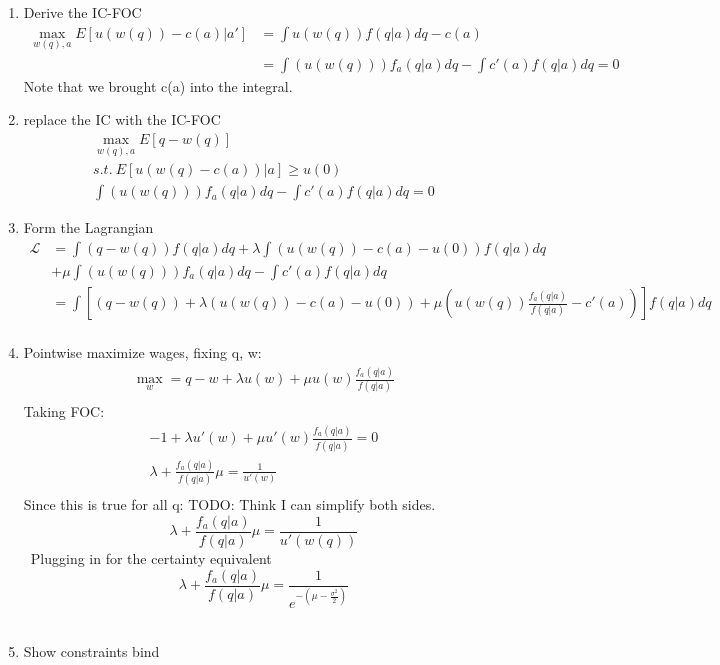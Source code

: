 \documentclass[answers]{exam}
\begin{document}
\begin{questions}
\begin{parts}
\begin{solution}
    \begin{enumerate}
        \item Derive the IC-FOC
        \begin{align*}
            \max_{w(q),a} E[u(w(q)) -c(a)|a'] &= \int u(w(q)) f(q|a)dq - c(a)\\
            &= \int (u(w(q))) f_a(q|a)dq - \int  c'(a) f(q|a)dq= 0
        \end{align*}
        Note that we brought c(a) into the integral.
        \item replace the IC with the IC-FOC
        \begin{align*}
            \max_{w(q), a} E[q-w(q)]\\
            s.t. \ E[u(w(q) - c(a))| a] \geq u(0)\\
            \int (u(w(q))) f_a(q|a)dq - \int  c'(a) f(q|a)dq= 0
        \end{align*}
        \item Form the Lagrangian
        \begin{align*}
            \mathcal{L} &= \int (q-w(q))f(q|a)dq + \lambda \int (u(w(q)) - c(a) -u(0))f(q|a)dq \\
            &+ \mu \int (u(w(q))) f_a(q|a)dq - \int  c'(a) f(q|a)dq\\
            &= \int [(q-w(q)) +  \lambda (u(w(q)) - c(a) -u(0)) + \mu (u(w(q)) \frac{f_a(q|a)}{f(q|a)}-c'(a))] f(q|a)dq   \\
        \end{align*}
        \item Pointwise maximize wages, fixing q, w:
        \begin{align*}
            \max_w = q - w + \lambda u(w) + \mu u(w) \frac{f_a(q|a)}{f(q|a)}\\
        \end{align*}
        Taking FOC:
        \begin{align*}
            -1 + \lambda u'(w) + \mu u'(w)\frac{f_a(q|a)}{f(q|a)} = 0\\
            \lambda + \frac{f_a(q|a)}{f(q|a)} \mu = \frac{1}{u'(w)}\\
        \end{align*}
        Since this is true for all q:
        TODO: Think I can simplify both sides. 
        $$\lambda + \frac{f_a(q|a)}{f(q|a)} \mu = \frac{1}{u'(w(q))}$$\
        Plugging in for the certainty equivalent
        $$\lambda + \frac{f_a(q|a)}{f(q|a)} \mu = \frac{1}{e^{-(\mu- \frac{\sigma^2}{2})}}$$\
        \item Show constraints bind
    \end{enumerate}
\end{solution}
\end{parts}


\end{questions}
\end{document}
